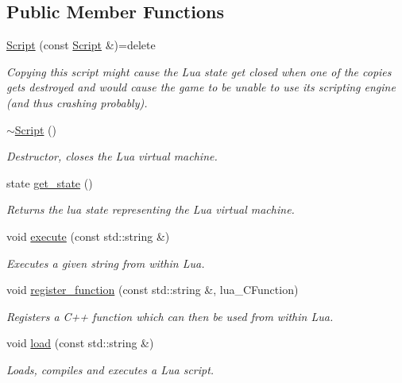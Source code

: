 \subsection*{Public Member Functions}
\begin{DoxyCompactItemize}
\item 
\hyperlink{classlpp_1_1_script_a7f4bd859e2dd9925694e7b3bb004ce67}{Script} (const \hyperlink{classlpp_1_1_script}{Script} \&)=delete
\begin{DoxyCompactList}\small\item\em Copying this script might cause the Lua state get closed when one of the copies gets destroyed and would cause the game to be unable to use it\textquotesingle{}s scripting engine (and thus crashing probably). \end{DoxyCompactList}\item 
\hyperlink{classlpp_1_1_script_ad2e00e9ebbf4e78370bd21357ba01b36}{$\sim$\+Script} ()
\begin{DoxyCompactList}\small\item\em Destructor, closes the Lua virtual machine. \end{DoxyCompactList}\item 
state \hyperlink{classlpp_1_1_script_a2d4f9b1265f7866aa5991f69091b7265}{get\+\_\+state} ()
\begin{DoxyCompactList}\small\item\em Returns the lua state representing the Lua virtual machine. \end{DoxyCompactList}\item 
void \hyperlink{classlpp_1_1_script_a8e287a10f658161d9bf90ee3f39706b4}{execute} (const std\+::string \&)
\begin{DoxyCompactList}\small\item\em Executes a given string from within Lua. \end{DoxyCompactList}\item 
void \hyperlink{classlpp_1_1_script_a39d9522568a7187e65ebc20575ad6d4c}{register\+\_\+function} (const std\+::string \&, lua\+\_\+\+C\+Function)
\begin{DoxyCompactList}\small\item\em Registers a C++ function which can then be used from within Lua. \end{DoxyCompactList}\item 
void \hyperlink{classlpp_1_1_script_a14b6b2d01d21fe061cfcf5983cfd3e2f}{load} (const std\+::string \&)
\begin{DoxyCompactList}\small\item\em Loads, compiles and executes a Lua script. \end{DoxyCompactList}\item 

\end{DoxyCompactItemize}
